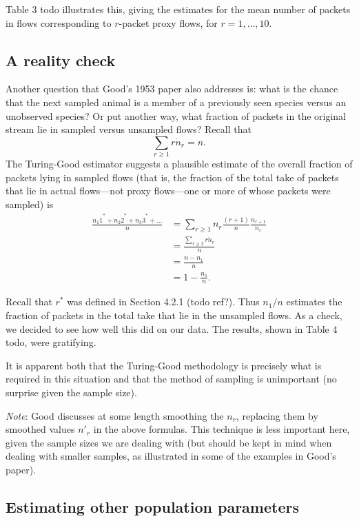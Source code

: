 \documentclass{paper}
\begin{document}
Table 3 todo illustrates this, giving the estimates for the mean number of
packets in flows corresponding to $r$-packet proxy flows, for $r = 1, \dots,
10$.

\subsection{A reality check}

Another question that Good's 1953 paper also addresses is: what is the chance
that the next sampled animal is a member of a previously seen species versus an
unobserved species? Or put another way, what fraction of packets in
the original stream lie in sampled versus unsampled flows? Recall that
$$ \sum_{r \geq 1} r \dot n_r = n. $$
The Turing-Good estimator suggests a plausible estimate of the overall fraction
of packets lying in sampled flows (that is, the fraction of the total take of
packets that lie in actual flows---not proxy flows---one or more of whose
packets were sampled) is
\begin{align*}
  \frac{n_1 \dot 1^* + n_2 \dot 2^* + n_3 \dot 3^* + \dots}{n}
  &= \sum_{r \geq 1} n_r \frac{(r + 1)}{n} \frac{n_{r+1}}{n_r} \\
  &= \frac{\sum_{r \geq 2} r \dot n_r}{n} \\
  &= \frac{n - n_1}{n} \\
  &= 1 - \frac{n_1}{n}.
\end{align*}

Recall that $r^*$ was defined in Section 4.2.1 (todo ref?). Thus $n_1/n$
estimates the fraction of packets in the total take that lie in the unsampled
flows. As a check, we decided to see how well this did on our data. The
results, shown in Table 4 todo, were gratifying.

It is apparent both that the Turing-Good methodology is precisely what is
required in this situation and that the method of sampling is unimportant (no
surprise given the sample size).

\emph{Note}: Good discusses at some length smoothing the $n_r$, replacing them
by smoothed values $n'_r$ in the above formulas. This technique is less
important here, given the sample sizes we are dealing with (but should be kept
in mind when dealing with smaller samples, as illustrated in some of the
examples in Good's paper).

\subsection{Estimating other population parameters}
\end{document}
